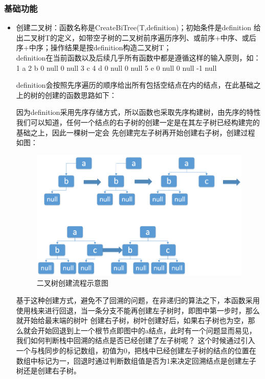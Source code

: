 \documentclass[supercite]{Experimental_Report}
\theoremstyle{definition}
\begin{document}
\subsubsection{基础功能}
\begin{itemize}
	\item 创建二叉树：函数名称是CreateBiTree(T,definition)；初始条件是definition 给出二叉树T的定义，如带空子树的二叉树前序遍历序列、或前序+中序、或后序+中序；操作结果是按definition构造二叉树T；\\
	      definition在当前函数以及后续几乎所有函数中都是遵循这样的输入原则，如：1 a 2 b 0 null  0 null 3 c 4 d  0 null  0 null 5 e  0 null  0 null -1 null

	      definition会按照先序遍历的顺序给出所有包括空结点在内的结点，在此基础之上的树的创建的函数思路如下：

	      因为definition采用先序存储方式，所以函数也采取先序构建树，由先序的特性我们可以知道，任何一个结点的右子树的创建一定是在其左子树已经构建完的基础之上，因此一棵树一定会
	      先创建完左子树再开始创建右子树，创建过程如图：
	      \begin{figure}[htb]
		      \begin{center}
			      \includegraphics[scale=0.50]{images/pic-5.png}
			      \caption{二叉树创建流程示意图}
			      \label{fig2-2}
		      \end{center}
	      \end{figure}
	      基于这种创建方式，避免不了回溯的问题，在非递归的算法之下，本函数采用使用栈来进行回退，当一条分支不能再创建左子树时，即图中第一步时，那么就开始给最末端的树叶
	      创建右子树，树叶创建好后，如果右子树也为空，那么就会开始回退到上一个根节点即图中的a结点，此时有一个问题显而易见，我们如何判断栈中回溯的结点是否已经创建了左子树呢？
	      这个时候通过引入一个与栈同步的标记数组，初值为0，把栈中已经创建左子树的结点的位置在数组中标记为一，回退时通过判断数组值是否为1来决定回溯结点是创建左子树还是创建右子树。


\end{itemize}
\end{document}
